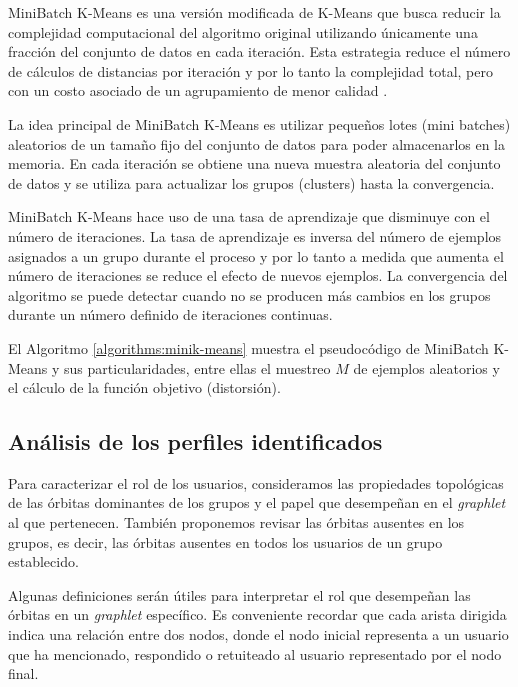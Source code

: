 MiniBatch K-Means \cite{sculley_web-scale_2010} es una versión modificada de K-Means que busca reducir la complejidad computacional del algoritmo original utilizando únicamente una fracción del conjunto de datos en cada iteración. Esta estrategia reduce el número de cálculos de distancias por iteración y por lo tanto la complejidad total, pero con un costo asociado de un agrupamiento de menor calidad \cite{bejar_k-means_nodate}.

La idea principal de MiniBatch K-Means es utilizar pequeños lotes (mini batches) aleatorios de un tamaño fijo del conjunto de datos para poder almacenarlos en la memoria. En cada iteración se obtiene una nueva muestra aleatoria del conjunto de datos y se utiliza para actualizar los grupos (clusters) hasta la convergencia. 

MiniBatch K-Means hace uso de una tasa de aprendizaje que disminuye con el número de iteraciones. La tasa de aprendizaje es inversa del número de ejemplos asignados a un grupo durante el proceso y por lo tanto a medida que aumenta el número de iteraciones se reduce el efecto de nuevos ejemplos. La convergencia del algoritmo se puede detectar cuando no se producen más cambios en los grupos durante un número definido de iteraciones continuas. 

El Algoritmo \ref{algorithms:minik-means} muestra el pseudocódigo de MiniBatch K-Means y sus particularidades, entre ellas el muestreo $M$ de ejemplos aleatorios y el cálculo de la función objetivo (distorsión).

\label{algorithms:minik-means}

\subsection{Análisis de los perfiles identificados}
Para caracterizar el rol de los usuarios, consideramos las propiedades topológicas de las órbitas dominantes de los grupos y el papel que desempeñan en el \textit{graphlet} al que pertenecen. También proponemos revisar las órbitas ausentes en los grupos, es decir, las órbitas ausentes en todos los usuarios de un grupo establecido.

Algunas definiciones serán útiles para interpretar el rol que desempeñan las órbitas en un \textit{graphlet} específico. Es conveniente recordar que cada arista dirigida indica una relación entre dos nodos, donde el nodo inicial representa a un usuario que ha mencionado, respondido o retuiteado al usuario representado por el nodo final. 

